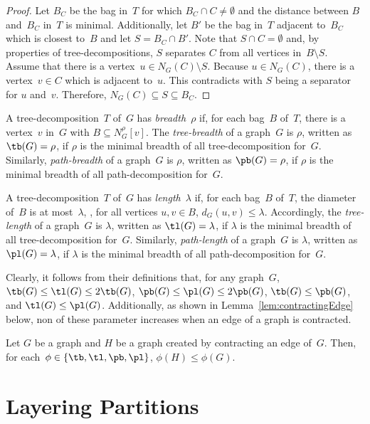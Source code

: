 \begin{proof}
Let $B_C$ be the bag in~$T$ for which $B_C \cap C \neq \emptyset$ and the distance between $B$ and~$B_C$ in~$T$ is minimal.
Additionally, let $B'$ be the bag in~$T$ adjacent to~$B_C$ which is closest to~$B$ and let $S = B_C \cap B'$.
Note that $S \cap C = \emptyset$ and, by properties of tree-decompositions, $S$ separates $C$ from all vertices in~$B \setminus S$.
Assume that there is a vertex~$u \in N_G(C) \setminus S$.
Because $u \in N_G(C)$, there is a vertex~$v \in C$ which is adjacent to~$u$.
This contradicts with $S$ being a separator for $u$ and~$v$.
Therefore, $N_G(C) \subseteq S \subseteq B_C$.
\end{proof}

A tree-decomposition~$T$ of~$G$ has \emph{breadth~\( \rho \)} if, for each bag~$B$ of~$T$, there is a vertex~$v$ in~$G$ with $B \subseteq N_G^\rho[v]$.
The \emph{tree-breadth} of a graph~$G$ is $\rho$, written as $\tb(G) = \rho$, if $\rho$ is the minimal breadth of all tree-decomposition for~$G$.
Similarly, \emph{path-breadth} of a graph~$G$ is $\rho$, written as $\pb(G) = \rho$, if $\rho$ is the minimal breadth of all path-decomposition for~$G$.

A tree-decomposition~$T$ of~$G$ has \emph{length~\( \lambda \)} if, for each bag~$B$ of~$T$, the diameter of~$B$ is at most~$\lambda$, \ie, for all vertices $u, v \in B$, $d_G(u, v) \leq \lambda$.
Accordingly, the \emph{tree-length} of a graph~$G$ is $\lambda$, written as $\tl(G) = \lambda$, if $\lambda$ is the minimal breadth of all tree-decomposition for~$G$.
Similarly, \emph{path-length} of a graph~$G$ is $\lambda$, written as $\pl(G) = \lambda$, if $\lambda$ is the minimal breadth of all path-decomposition for~$G$.

Clearly, it follows from their definitions that, for any graph~$G$, $\tb(G) \leq \tl(G) \leq 2 \tb(G)$, $\pb(G) \leq \pl(G) \leq 2 \pb(G)$, $\tb(G) \leq \pb(G)$, and $\tl(G) \leq \pl(G)$.
Additionally, as shown in Lemma~\ref{lem:contractingEdge} below, non of these parameter increases when an edge of a graph is contracted.

\begin{lemma}
    \label{lem:contractingEdge}
Let \( G \) be a graph and \( H \) be a graph created by contracting an edge of~\( G \).
Then, for each~\( \phi \in \{ \tb, \tl, \pb, \pl \} \), \( \phi(H) \leq \phi(G) \).
\end{lemma}


\section{Layering Partitions}

